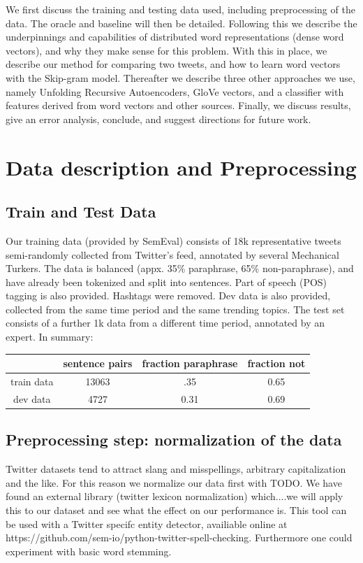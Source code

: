 \documentclass[conference]{IEEEtran}
\begin{document}
\indent We first discuss the training and testing data used, including preprocessing of the data.   The oracle and baseline will then be detailed.  Following this we describe the underpinnings and capabilities of distributed word representations (dense word vectors), and why they make sense for this problem.  With this in place, we describe our method for comparing two tweets, and how to learn word vectors with the Skip-gram model.  Thereafter we describe three other approaches we use, namely Unfolding Recursive Autoencoders, GloVe vectors, and a classifier with features derived from word vectors and other sources.  Finally, we discuss results, give an error analysis, conclude, and suggest directions for future work.
\section{Data description and Preprocessing}
\subsection {Train and Test Data} 
Our training data (provided by SemEval) consists of 18k representative tweets semi-randomly collected from Twitter's feed, annotated by several Mechanical Turkers.  The data is balanced (appx. 35\% paraphrase, 65\% non-paraphrase), and have already been tokenized and split into sentences.  Part of speech (POS) tagging is also provided. Hashtags were removed.  Dev data is also provided, collected from the same time period and the same trending topics. The test set  consists of a further 1k data from a different time period, annotated by an expert.  In summary:

\begin{table}
\begin{tabular}{| c | c | c | c | }
\hline
 & sentence pairs & fraction paraphrase & fraction not \\ \hline
train data & 13063          & .35                 & 0.65                    \\ \hline
dev data  & 4727   & 0.31      & 0.69      \\ \hline
\end{tabular}
\end{table}

\subsection{Preprocessing step: normalization of the data}
Twitter datasets tend to attract slang and misspellings, arbitrary capitalization and the like.  For this reason we normalize our data first with TODO.  We have found an external library (twitter lexicon normalization) which....we will apply this to our dataset and see what the effect on our performance is.  This tool can be used with a Twitter specifc entity detector, availiable online at https://github.com/sem-io/python-twitter-spell-checking. Furthermore one could experiment with basic word stemming.  
\end{document}
